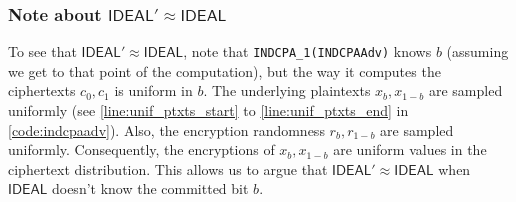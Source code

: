 \documentclass{article}[12pt]
\newcommand{\code}[1]{\texttt{#1}} %
\newcommand{\Ideal}{{\mathsf{IDEAL}}}
\begin{document}
\subsubsection{Note about $\Ideal' \approx \Ideal$}\label{sec:ideal_prime_equiv_ideal}
To see that $\Ideal' \approx \Ideal$, note that \code{INDCPA\_1(INDCPAAdv)} knows $b$ (assuming we get to that point of the computation), but the way it computes the ciphertexts $c_0, c_1$ is uniform in $b$. The underlying plaintexts $x_b, x_{1-b}$ are sampled uniformly (see \cref{line:unif_ptxts_start} to \cref{line:unif_ptxts_end} in \cref{code:indcpaadv}). Also, the encryption randomness $r_b, r_{1-b}$ are sampled uniformly. Consequently, the encryptions of $x_b, x_{1-b}$ are uniform values in the ciphertext distribution. This allows us to argue that $\Ideal' \approx \Ideal$ when $\Ideal$ doesn't know the committed bit $b$.

{\small{


}}
\end{document}
